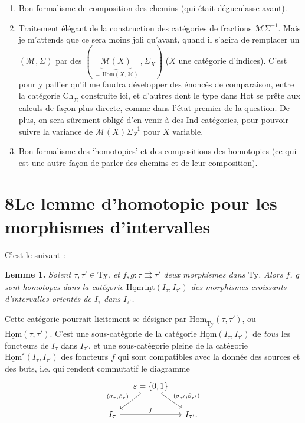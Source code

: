 \documentclass[11pt]{article}
\newcommand{\printedpage}[1]{\marginpar{\footnotesize p.~#1}}
\newcommand{\msp}[1]{\marginpar{\vspace*{10pt}\footnotesize [#1]}}
\newcommand{\uTy}{\underline{\mathrm{Ty}}}
\newcommand{\Ch}{\underline{\mathrm{Ch}}}
\newcommand{\uHom}{\underline{\mathrm{Hom}}}
\begin{document}
\begin{enumerate}
\item[a)] Bon formalisme de composition des chemins (qui était dégueulasse avant).

\item[b)] Traitement élégant de la construction des catégories de fractions $\mathcal{M}\Sigma^{-1}$. Mais je m'attends que ce sera moins joli qu'avant, quand il s'agira de remplacer un $(\mathcal{M},\Sigma)$ par des $(\ \underbrace{\mathcal{M}(X)}_{=\,\uHom(X,\mathcal{M})}\ ,\Sigma_X)$ ($X$ une catégorie d'indices). C'est pour y pallier qu'il me faudra développer des énoncés de comparaison, entre la catégorie $\Ch_{\Sigma}$ construite ici, et d'autres dont le type dans Hot se prête aux calculs de façon plus directe, comme dans l'état premier de la question. De plus, on sera sûrement obligé d'en venir à des Ind-catégories, pour pouvoir suivre la variance de $\mathcal{M}(X)\Sigma_X^{-1}$ pour $X$ variable.

\item[c)] Bon formalisme des `homotopies' et des compositions des homotopies (ce qui est une autre façon de parler des chemins et de leur composition).
\end{enumerate}

\printedpage{54}

\msp{page 83}

\section*{8\quad Le lemme d'homotopie pour les morphismes d'intervalles}

C'est le suivant :

\textbf{Lemme 1.} \textit{Soient $\tau,\tau'\in\mathrm{Ty}$, et $f,g:\tau\rightrightarrows\tau'$ deux morphismes dans $\uTy$. Alors $f$, $g$ sont homotopes dans la catégorie $\uHom\,\underline{\mathrm{int}}(I_\tau,I_{\tau'})$ des morphismes croissants d'intervalles orientés de $I_\tau$ dans $I_{\tau'}$.}

Cette catégorie pourrait licitement se désigner par $\uHom_{\uTy}(\tau,\tau')$, ou $\uHom(\tau,\tau')$. C'est une sous-catégorie de la catégorie $\uHom(I_\tau,I_{\tau'})$ de \textit{tous} les foncteurs de $I_\tau$ dans $I_{\tau'}$, et une sous-catégorie pleine de la catégorie $\uHom^\varepsilon(I_\tau,I_{\tau'})$ des foncteurs $f$ qui sont compatibles avec la donnée des sources et des buts, i.e. qui rendent commutatif le diagramme
\[
\begin{tikzcd}[column sep=small]
 & \varepsilon=\{0,1\} \arrow[dl, hook', "{(\sigma_\tau,\beta_\tau)}"'] \arrow[dr, hook, "{(\sigma_{\tau'},\beta_{\tau'})}"] & \\
I_\tau \arrow[rr, "f"] & & I_{\tau'}.
\end{tikzcd}
\]
\end{document}
